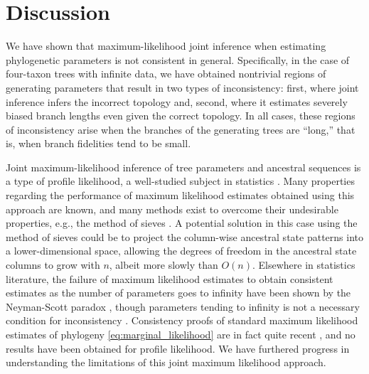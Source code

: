 \documentclass{article}
\newcommand{\nCols}{n}
\begin{document}
\section*{Discussion}

We have shown that maximum-likelihood joint inference when estimating phylogenetic parameters \cite{Sagulenko2017-jo} is not consistent in general.
Specifically, in the case of four-taxon trees with infinite data, we have obtained nontrivial regions of generating parameters that result in two types of inconsistency: first, where joint inference infers the incorrect topology and, second, where it estimates severely biased branch lengths even given the correct topology.
In all cases, these regions of inconsistency arise when the branches of the generating trees are ``long,'' that is, when branch fidelities tend to be small.

Joint maximum-likelihood inference of tree parameters and ancestral sequences is a type of profile likelihood, a well-studied subject in statistics \cite{Murphy2000-ry}.
Many properties regarding the performance of maximum likelihood estimates obtained using this approach are known, and many methods exist to overcome their undesirable properties, e.g., the method of sieves \cite{Geman1982}.
A potential solution in this case using the method of sieves could be to project the column-wise ancestral state patterns into a lower-dimensional space, allowing the degrees of freedom in the ancestral state columns to grow with $\nCols$, albeit more slowly than $O(\nCols)$.
Elsewhere in statistics literature, the failure of maximum likelihood estimates to obtain consistent estimates as the number of parameters goes to infinity have been shown by the Neyman-Scott paradox \cite{Neyman1948-tt}, though parameters tending to infinity is not a necessary condition for inconsistency \cite{LeCam1990}.
Consistency proofs of standard maximum likelihood estimates of phylogeny \eqref{eq:marginal_likelihood} are in fact quite recent \cite{RoyChoudhury2015-ta}, and no results have been obtained for profile likelihood.
We have furthered progress in understanding the limitations of this joint maximum likelihood approach.
\end{document}
